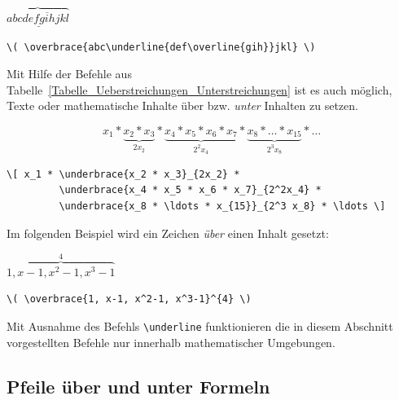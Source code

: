 \documentclass[a4paper,10pt,twoside]{scrbook}
\begin{document}
\begin{minipage}[c]{.3\textwidth}
\setlength{\parskip}{1em}
\centering
\( \overbrace{abc\underline{def\overline{gih}}jkl} \)
\end{minipage}
\hfill
\begin{minipage}[c]{.68\textwidth}
\setlength{\parskip}{1em}
\begin{lstlisting}[label=overbracebeispiel, style=customlatex]
\( \overbrace{abc\underline{def\overline{gih}}jkl} \)
\end{lstlisting}
\end{minipage}



Mit Hilfe der Befehle aus Tabelle~\ref{Tabelle_Ueberstreichungen_Unterstreichungen} 
ist es auch möglich, Texte oder mathematische Inhalte über bzw. \textsl{unter} Inhalten zu setzen.


\[ x_1 * \underbrace{x_2 * x_3}_{2x_2} * 
         \underbrace{x_4 * x_5 * x_6 * x_7}_{2^2x_4} * 
         \underbrace{x_8 * \ldots * x_{15}}_{2^3 x_8} * \ldots \]


\begin{lstlisting}[label=underbracebeispiel, style=customlatex]
\[ x_1 * \underbrace{x_2 * x_3}_{2x_2} * 
         \underbrace{x_4 * x_5 * x_6 * x_7}_{2^2x_4} * 
         \underbrace{x_8 * \ldots * x_{15}}_{2^3 x_8} * \ldots \]
\end{lstlisting}

Im folgenden Beispiel wird ein Zeichen \textsl{über} einen Inhalt gesetzt:

\begin{minipage}[c]{.3\textwidth}
\setlength{\parskip}{1em}
\centering
\( \overbrace{1, x-1, x^2-1, x^3-1}^{4} \)
\end{minipage}
\hfill
\begin{minipage}[c]{.68\textwidth}
\setlength{\parskip}{1em}
\begin{lstlisting}[label=overbracebeispiel2, style=customlatex]
\( \overbrace{1, x-1, x^2-1, x^3-1}^{4} \)
\end{lstlisting}
\end{minipage}


Mit Ausnahme des Befehls \verb!\underline! funktionieren die in diesem Abschnitt vorgestellten Befehle nur innerhalb mathematischer Umgebungen.

\subsection{Pfeile über und unter Formeln}
\end{document}

